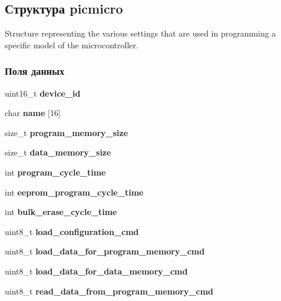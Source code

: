 \subsection{Структура picmicro}
\label{structpicmicro}


Structure representing the various settings that are used in programming a specific model of the microcontroller.  


\subsubsection*{Поля данных}
\begin{DoxyCompactItemize}
\item 
\mbox{\label{structpicmicro_ae8700029f467a681147688cc88e06149}} 
uint16\+\_\+t {\bfseries device\+\_\+id}
\item 
\mbox{\label{structpicmicro_a0f37d7b9239a5a0fc3c112b7df2a62a6}} 
char {\bfseries name} [16]
\item 
\mbox{\label{structpicmicro_ad73ddb9cef8d94d3a55dff699ce5520d}} 
size\+\_\+t {\bfseries program\+\_\+memory\+\_\+size}
\item 
\mbox{\label{structpicmicro_a5c61aaf430dfb8a2bdac4ce8bb64e02e}} 
size\+\_\+t {\bfseries data\+\_\+memory\+\_\+size}
\item 
\mbox{\label{structpicmicro_a8a81dcc01cd968f2d126b700182fca0f}} 
int {\bfseries program\+\_\+cycle\+\_\+time}
\item 
\mbox{\label{structpicmicro_aebd91b84262c63d20ff62a910966b742}} 
int {\bfseries eeprom\+\_\+program\+\_\+cycle\+\_\+time}
\item 
\mbox{\label{structpicmicro_ae4ce8b1e22bacaf55366f2434c514fa7}} 
int {\bfseries bulk\+\_\+erase\+\_\+cycle\+\_\+time}
\item 
\mbox{\label{structpicmicro_ac2dc164849fd9c753d99ab6819446cdb}} 
uint8\+\_\+t {\bfseries load\+\_\+configuration\+\_\+cmd}
\item 
\mbox{\label{structpicmicro_af56cb3611129343a8712e56500d5f7d3}} 
uint8\+\_\+t {\bfseries load\+\_\+data\+\_\+for\+\_\+program\+\_\+memory\+\_\+cmd}
\item 
\mbox{\label{structpicmicro_a69bdbb5f0a8bf00945ab4a3b34873f30}} 
uint8\+\_\+t {\bfseries load\+\_\+data\+\_\+for\+\_\+data\+\_\+memory\+\_\+cmd}
\item 
\mbox{\label{structpicmicro_ad061f05ec8a20b291d39010a15056e61}} 
uint8\+\_\+t {\bfseries read\+\_\+data\+\_\+from\+\_\+program\+\_\+memory\+\_\+cmd}
\item 

\end{DoxyCompactItemize}
